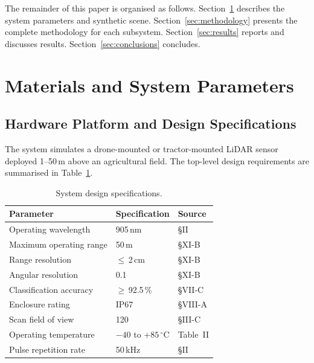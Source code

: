 \documentclass[12pt,a4paper]{article}
\newcommand{\degC}{$^\circ$C}
\begin{document}
The remainder of this paper is organised as follows.
Section~\ref{sec:materials} describes the system parameters and synthetic scene.
Section~\ref{sec:methodology} presents the complete methodology for each subsystem.
Section~\ref{sec:results} reports and discusses results.
Section~\ref{sec:conclusions} concludes.

\section{Materials and System Parameters}
\label{sec:materials}

\subsection{Hardware Platform and Design Specifications}

The system simulates a drone-mounted or tractor-mounted LiDAR sensor deployed
1--50\,m above an agricultural field. The top-level design requirements are
summarised in Table~\ref{tab:specs}.

\begin{table}[H]
\centering
\caption{System design specifications.}
\label{tab:specs}
\begin{tabular}{lll}
\toprule
\textbf{Parameter} & \textbf{Specification} & \textbf{Source} \\
\midrule
Operating wavelength        & 905\,nm           & \S II    \\
Maximum operating range     & 50\,m             & \S XI-B  \\
Range resolution            & $\leq$\,2\,cm     & \S XI-B  \\
Angular resolution          & 0.1\textdegree{}  & \S XI-B  \\
Classification accuracy     & $\geq$\,92.5\,\%  & \S VII-C \\
Enclosure rating            & IP67              & \S VIII-A\\
Scan field of view          & 120\textdegree{}  & \S III-C \\
Operating temperature       & $-40$ to $+85$\,\degC & Table~II \\
Pulse repetition rate       & 50\,kHz           & \S II    \\
\bottomrule
\end{tabular}
\end{table}
\end{document}
